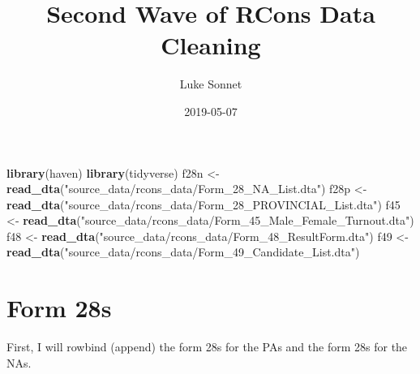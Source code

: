 \documentclass[]{article}
\title{Second Wave of RCons Data Cleaning}
\author{Luke Sonnet}
\date{2019-05-07}
\newenvironment{Shaded}{\begin{snugshade}}{\end{snugshade}}
\newcommand{\DataTypeTok}[1]{\textcolor[rgb]{0.13,0.29,0.53}{#1}}
\newcommand{\KeywordTok}[1]{\textcolor[rgb]{0.13,0.29,0.53}{\textbf{#1}}}
\newcommand{\NormalTok}[1]{#1}
\newcommand{\OperatorTok}[1]{\textcolor[rgb]{0.81,0.36,0.00}{\textbf{#1}}}
\newcommand{\StringTok}[1]{\textcolor[rgb]{0.31,0.60,0.02}{#1}}
\begin{document}
\maketitle

\begin{Shaded}
\begin{Highlighting}[]
\KeywordTok{library}\NormalTok{(haven)}
\KeywordTok{library}\NormalTok{(tidyverse)}
\NormalTok{f28n <-}\StringTok{ }\KeywordTok{read_dta}\NormalTok{(}\StringTok{"source_data/rcons_data/Form_28_NA_List.dta"}\NormalTok{)}
\NormalTok{f28p <-}\StringTok{ }\KeywordTok{read_dta}\NormalTok{(}\StringTok{"source_data/rcons_data/Form_28_PROVINCIAL_List.dta"}\NormalTok{)}
\NormalTok{f45 <-}\StringTok{ }\KeywordTok{read_dta}\NormalTok{(}\StringTok{"source_data/rcons_data/Form_45_Male_Female_Turnout.dta"}\NormalTok{)}
\NormalTok{f48 <-}\StringTok{ }\KeywordTok{read_dta}\NormalTok{(}\StringTok{"source_data/rcons_data/Form_48_ResultForm.dta"}\NormalTok{)}
\NormalTok{f49 <-}\StringTok{ }\KeywordTok{read_dta}\NormalTok{(}\StringTok{"source_data/rcons_data/Form_49_Candidate_List.dta"}\NormalTok{)}
\end{Highlighting}
\end{Shaded}

\hypertarget{form-28s}{%
\section{Form 28s}\label{form-28s}}

First, I will rowbind (append) the form 28s for the PAs and the form 28s
for the NAs.

\begin{Shaded}
\end{Shaded}
\end{document}
